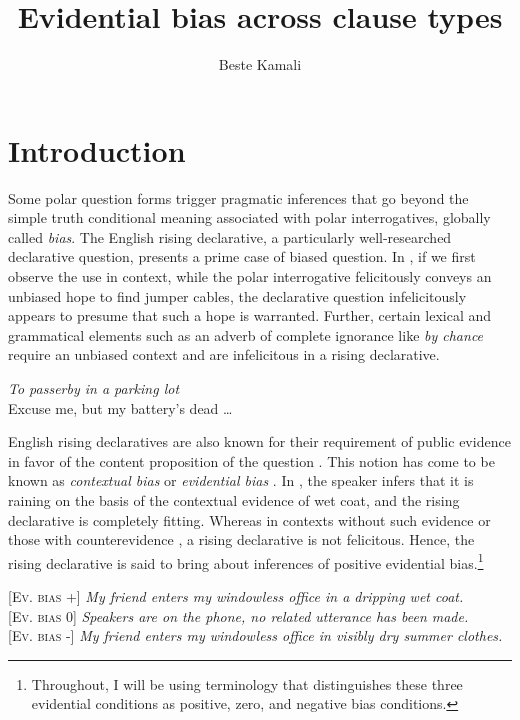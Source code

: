 \documentclass[output=paper,colorlinks,citecolor=brown]{langscibook}
\author{Beste Kamali\affiliation{University of Amsterdam, Institute of Logic, Language, and Computation}\orcid{0000-0002-3292-078X}}
\title{Evidential bias across clause types}
\begin{document}
\maketitle



\section{Introduction}\label{sec:11:intro}

Some polar question forms trigger pragmatic inferences that go beyond the simple truth conditional meaning associated with polar interrogatives, globally call\-ed \textit{bias}. The English rising declarative, a particularly well-researched declarative question, presents a prime case of biased question. In , if we first observe the use in context, while the polar interrogative felicitously conveys an unbiased hope to find jumper cables, the declarative question infelicitously appears to presume that such a hope is warranted. Further, certain lexical and grammatical elements such as an adverb of complete ignorance like \textit{by chance} require an unbiased context and are infelicitous in a rising declarative.

\ea\label{ex1}\textit{To passerby in a parking lot}\\
Excuse me, but my battery's dead \ldots
{}\label{ex:11:1a}
\label{ex:11:1b} 
\z
\z

English rising declaratives are also known for their requirement of public evidence in favor of the content proposition of the question \citep{gunlogson}. This notion has come to be known as \textit{contextual bias} or \textit{evidential bias} \citep{sudo-bias}. In , the speaker infers that it is raining on the basis of the contextual evidence of wet coat, and the rising declarative is completely fitting. Whereas in contexts without such evidence  or those with counterevidence , a rising declarative is not felicitous. Hence, the rising declarative is said to bring about inferences of positive evidential bias.\footnote{Throughout, I will be using  terminology that distinguishes these three evidential conditions as positive, zero, and negative bias conditions.}


\ea \label{ex:11:2}
\ea \textsc{[Ev. bias +]} \textit{My friend enters my windowless office in a dripping wet coat.}\\
\label{ex:11:2a}
\ex \textsc{[Ev. bias 0]} \textit{Speakers are on the phone, no related utterance has been made.}\\ 
\label{ex:11:2b}
\ex \textsc{[Ev. bias -]} \textit{My friend enters my windowless office in visibly dry summer clothes.}\\ 
\label{ex:11:2c}
\z
\z
 
\end{document}
